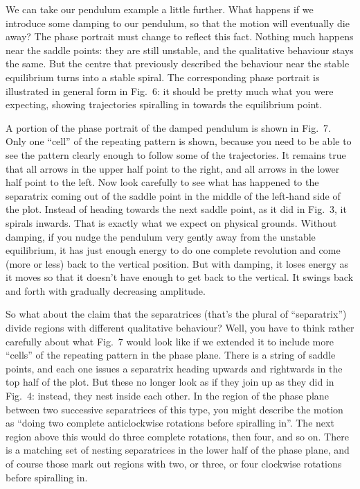   We can take our pendulum example a little further. What happens if we 
  introduce some damping to our pendulum, so that the motion will eventually 
  die away? The phase portrait must change to reflect this fact. Nothing much 
  happens near the saddle points: they are still unstable, and the qualitative 
  behaviour stays the same. But the centre that previously described the 
  behaviour near the stable equilibrium turns into a stable spiral. The 
  corresponding phase portrait is illustrated in general form in Fig.\ 6: it 
  should be pretty much what you were expecting, showing trajectories 
  spiralling in towards the equilibrium point. 

  A portion of the phase portrait of the damped pendulum is shown in Fig.\ 7. 
  Only one ``cell'' of the repeating pattern is shown, because you need to be 
  able to see the pattern clearly enough to follow some of the trajectories. It 
  remains true that all arrows in the upper half point to the right, and all 
  arrows in the lower half point to the left. Now look carefully to see what 
  has happened to the separatrix coming out of the saddle point in the middle 
  of the left-hand side of the plot. Instead of heading towards the next saddle 
  point, as it did in Fig.\ 3, it spirals inwards. That is exactly what we 
  expect on physical grounds. Without damping, if you nudge the pendulum very 
  gently away from the unstable equilibrium, it has just enough energy to do 
  one complete revolution and come (more or less) back to the vertical 
  position. But with damping, it loses energy as it moves so that it doesn't 
  have enough to get back to the vertical. It swings back and forth with 
  gradually decreasing amplitude. 

  So what about the claim that the separatrices (that's the plural of 
  ``separatrix'') divide regions with different qualitative behaviour? Well, 
  you have to think rather carefully about what Fig.\ 7 would look like if we 
  extended it to include more ``cells'' of the repeating pattern in the phase 
  plane. There is a string of saddle points, and each one issues a separatrix 
  heading upwards and rightwards in the top half of the plot. But these no 
  longer look as if they join up as they did in Fig.\ 4: instead, they nest 
  inside each other. In the region of the phase plane between two successive 
  separatrices of this type, you might describe the motion as ``doing two 
  complete anticlockwise rotations before spiralling in''. The next region 
  above this would do three complete rotations, then four, and so on. There is 
  a matching set of nesting separatrices in the lower half of the phase plane, 
  and of course those mark out regions with two, or three, or four clockwise 
  rotations before spiralling in. 

